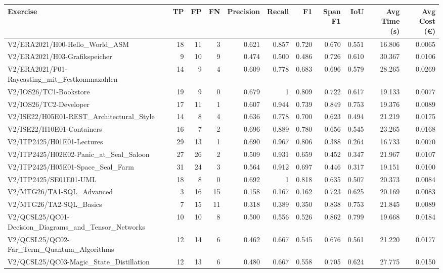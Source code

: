 \begin{tabular}{lrrrrrrrrrr}
Exercise & TP & FP & FN & Precision & Recall & F1 & Span F1 & IoU & Avg Time (s) & Avg Cost (€) \\
\hline
V2/ERA2021/H00-Hello\_World\_ASM & 18 & 11 & 3 & 0.621 & 0.857 & 0.720 & 0.670 & 0.551 & 16.806 & 0.0065 \\
V2/ERA2021/H03-Grafikspeicher & 9 & 10 & 9 & 0.474 & 0.500 & 0.486 & 0.726 & 0.610 & 30.367 & 0.0106 \\
V2/ERA2021/P01-Raycasting\_mit\_Festkommazahlen & 14 & 9 & 4 & 0.609 & 0.778 & 0.683 & 0.696 & 0.579 & 28.265 & 0.0269 \\
V2/IOS26/TC1-Bookstore & 19 & 9 & 0 & 0.679 & 1 & 0.809 & 0.722 & 0.617 & 19.133 & 0.0077 \\
V2/IOS26/TC2-Developer & 17 & 11 & 1 & 0.607 & 0.944 & 0.739 & 0.849 & 0.753 & 19.376 & 0.0089 \\
V2/ISE22/H05E01-REST\_Architectural\_Style & 14 & 8 & 4 & 0.636 & 0.778 & 0.700 & 0.623 & 0.494 & 21.219 & 0.0175 \\
V2/ISE22/H10E01-Containers & 16 & 7 & 2 & 0.696 & 0.889 & 0.780 & 0.656 & 0.545 & 23.265 & 0.0168 \\
V2/ITP2425/H01E01-Lectures & 29 & 13 & 1 & 0.690 & 0.967 & 0.806 & 0.388 & 0.264 & 16.733 & 0.0070 \\
V2/ITP2425/H02E02-Panic\_at\_Seal\_Saloon & 27 & 26 & 2 & 0.509 & 0.931 & 0.659 & 0.452 & 0.347 & 21.967 & 0.0107 \\
V2/ITP2425/H05E01-Space\_Seal\_Farm & 31 & 24 & 3 & 0.564 & 0.912 & 0.697 & 0.446 & 0.317 & 19.151 & 0.0100 \\
V2/ITP2425/SE01E01-UML & 18 & 8 & 0 & 0.692 & 1 & 0.818 & 0.635 & 0.507 & 20.373 & 0.0084 \\
V2/MTG26/TA1-SQL\_Advanced & 3 & 16 & 15 & 0.158 & 0.167 & 0.162 & 0.723 & 0.625 & 20.169 & 0.0083 \\
V2/MTG26/TA2-SQL\_Basics & 7 & 15 & 11 & 0.318 & 0.389 & 0.350 & 0.838 & 0.753 & 21.845 & 0.0089 \\
V2/QCSL25/QC01-Decision\_Diagrams\_and\_Tensor\_Networks & 10 & 10 & 8 & 0.500 & 0.556 & 0.526 & 0.862 & 0.799 & 19.668 & 0.0184 \\
V2/QCSL25/QC02-Far\_Term\_Quantum\_Algorithms & 12 & 14 & 6 & 0.462 & 0.667 & 0.545 & 0.676 & 0.561 & 21.220 & 0.0177 \\
V2/QCSL25/QC03-Magic\_State\_Distillation & 12 & 13 & 6 & 0.480 & 0.667 & 0.558 & 0.705 & 0.624 & 27.775 & 0.0150 \\
\end{tabular}

